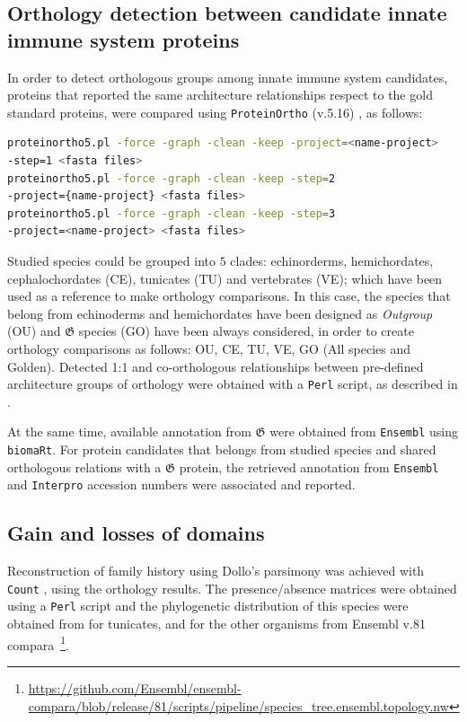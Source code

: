 \documentclass[11pt]{article}
\begin{document}
\subsection*{Orthology detection between candidate innate immune system 
proteins}
In order to detect orthologous groups among innate immune system candidates, 
proteins that reported the same architecture relationships respect to the gold 
standard proteins, were compared using \texttt{ProteinOrtho} (v.5.16) \cite{Lechner2011}, 
as follows:

\begin{lstlisting}[language=bash, breaklines=true]
proteinortho5.pl -force -graph -clean -keep -project=<name-project> 
-step=1 <fasta files>
proteinortho5.pl -force -graph -clean -keep -step=2 
-project={name-project} <fasta files>
proteinortho5.pl -force -graph -clean -keep -step=3  
-project=<name-project> <fasta files>
\end{lstlisting}

Studied species could be grouped into $5$ clades: echinorderms, hemichordates, 
cephalochordates (CE), tunicates (TU) and vertebrates (VE); which have been used 
as a reference to make orthology comparisons. In this case, the species that belong
from echinoderms and hemichordates have been designed as \textsl{Outgroup} (OU) and 
$\boldsymbol{\mathfrak{G}}$ species (GO) have been always considered, in order to create 
orthology comparisons as follows: OU, CE, TU, VE, GO (All species and Golden). Detected 1:1 and 
co-orthologous relationships between pre-defined architecture groups of orthology 
were obtained with a \texttt{Perl} script, as described in \cite{Lechner2011}.

At the same time, available annotation from $\boldsymbol{\mathfrak{G}}$ were obtained from 
\texttt{Ensembl} using \texttt{biomaRt}. For protein candidates that belongs from studied 
species and shared orthologous relations with a $\boldsymbol{\mathfrak{G}}$ protein, the 
retrieved annotation from \texttt{Ensembl} and \texttt{Interpro} accession numbers were 
associated and reported.

\subsection*{Gain and losses of domains}

Reconstruction of family history using Dollo's parsimony was 
achieved with \texttt{Count} \cite{csuros2010}, using the orthology 
results. The presence/absence matrices were obtained using a \texttt{Perl} script 
and the phylogenetic distribution of this species were obtained from 
\cite{Delsuc:2017, Kocot:2018} for tunicates, and for the other organisms from 
Ensembl v.81 compara~\footnote{\url{https://github.com/Ensembl/ensembl-compara/blob/release/81/scripts/pipeline/species_tree.ensembl.topology.nw}}.
\end{document}
